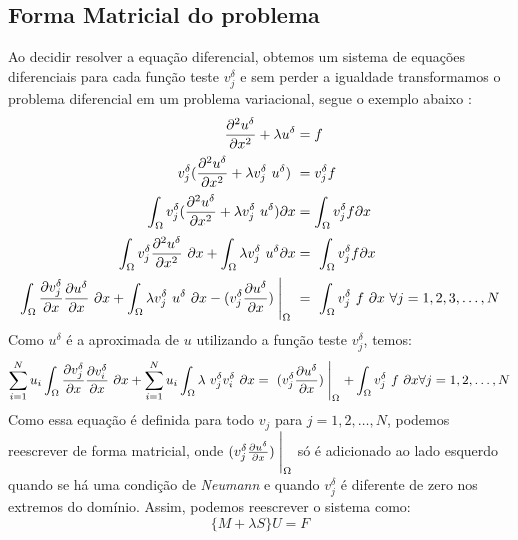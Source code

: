 \subsection{Forma Matricial do problema}
	Ao decidir resolver a equação diferencial, obtemos um sistema de equações diferenciais para cada função teste $v_j^\delta$  e sem perder a igualdade transformamos o problema diferencial em um problema variacional, segue o exemplo abaixo :
\begin{align}
\frac{\partial^2 u^\delta }{\partial x^2} + \lambda u^\delta &= f\\[1.5pt]
v^\delta_j (\frac{\partial^2 u^\delta }{\partial x^2} + \lambda v^\delta_j\ u^\delta) \ &= v^\delta_j f\\[1.5pt]
\int_\Omega v^\delta_j (\frac{\partial^2 u^\delta }{\partial x^2} + \lambda v^\delta_j\  u^\delta) \partial x &= \int_\Omega v^\delta_j  f \partial x\\[1.5pt]
\int_\Omega v^\delta_j \frac{\partial^2 u^\delta }{\partial x^2}\ \partial x + \int_\Omega \lambda v^\delta_j\ u^\delta\partial x &=\ \int_\Omega v^\delta_j  f \partial x\\[1.5pt]
\int_\Omega \frac{\partial v^\delta_j }{\partial x} \frac{\partial u^\delta }{\partial x}\ \partial x + \int_\Omega \lambda v^\delta_j\ u^\delta\ \partial x - (v^\delta_j  \frac{\partial u^\delta }{\partial x})\Biggm\lvert_\Omega\ &=\  \int_\Omega v^\delta_j\  f\ \partial x \ \forall j = 1,2,3,\dots,N 
\end{align}
 Como $u^\delta$ é a aproximada de $u$ utilizando a função teste $v^\delta_j$, temos:
\begin{align}
\sum^N_{i=1} u_i \int_\Omega \frac{\partial v^\delta_j }{\partial x} \frac{\partial v^\delta_i }{\partial x}\ \partial x +\sum^N_{i=1} u_i  \int_\Omega \lambda\ v^\delta_j v^\delta_i \ \partial x =\  (v^\delta_j  \frac{\partial u^\delta }{\partial x})\Biggm\lvert_\Omega + \int_\Omega v^\delta_j\ f\ \partial x \forall j =1,2,\dots,N 
\end{align}  
Como essa equação é definida para todo  $v_j$ para $j = 1,2,\dots,N$, podemos reescrever de forma matricial, onde $(v^\delta_j  \frac{\partial u^\delta }{\partial x})\Biggm\lvert_\Omega$ só é adicionado ao lado esquerdo quando se há uma condição de \emph{Neumann} e quando  $v^\delta_j$ é diferente de zero nos extremos do domínio. Assim, podemos reescrever o sistema como:
\begin{equation}
\{ M + \lambda S\} U = F
\end{equation}
